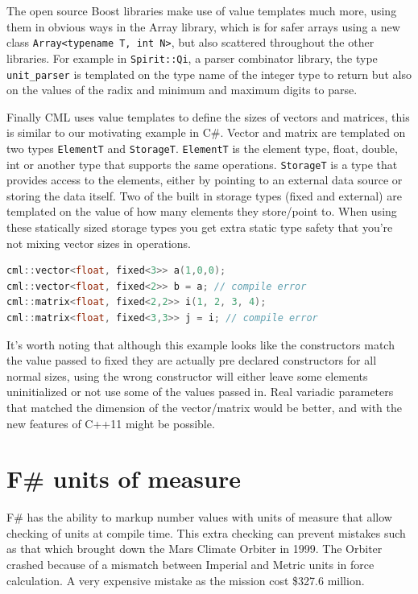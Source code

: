 \documentclass[english]{report}
\begin{document}
The open source Boost\cite{boost} libraries make use of value templates
much more, using them in obvious ways in the Array library, which
is for safer arrays using a new class \texttt{Array<typename T, int
N>}, but also scattered throughout the other libraries. For example
in \texttt{Spirit::Qi}, a parser combinator library, the type \texttt{unit\_parser}
is templated on the type name of the integer type to return but also
on the values of the radix and minimum and maximum digits to parse. 

Finally CML\cite{cmldev} uses value templates to define the sizes
of vectors and matrices, this is similar to our motivating example
in C\#. Vector and matrix are templated on two types \texttt{ElementT}
and \texttt{StorageT}. \texttt{ElementT} is the element type, float,
double, int or another type that supports the same operations. \texttt{StorageT}
is a type that provides access to the elements, either by pointing
to an external data source or storing the data itself. Two of the
built in storage types (fixed and external) are templated on the value
of how many elements they store/point to. When using these statically
sized storage types you get extra static type safety that you're not
mixing vector sizes in operations.

\begin{lstlisting}[keywordstyle={\color{blue}},language={C++}]
cml::vector<float, fixed<3>> a(1,0,0);
cml::vector<float, fixed<2>> b = a; // compile error
cml::matrix<float, fixed<2,2>> i(1, 2, 3, 4);
cml::matrix<float, fixed<3,3>> j = i; // compile error
\end{lstlisting}


It's worth noting that although this example looks like the constructors
match the value passed to fixed they are actually pre declared constructors
for all normal sizes, using the wrong constructor will either leave
some elements uninitialized or not use some of the values passed in.
Real variadic parameters that matched the dimension of the vector/matrix
would be better, and with the new features of C++11 might be possible.



\section{F\# units of measure\label{sec:Fsharp-units}}

F\# has the ability to markup number values with units of measure
that allow checking of units at compile time. This extra checking
can prevent mistakes such as that which brought down the Mars Climate
Orbiter in 1999. The Orbiter crashed because of a mismatch between
Imperial and Metric units in force calculation. A very expensive mistake
as the mission cost \$327.6 million\cite{mars}. 
\end{document}
